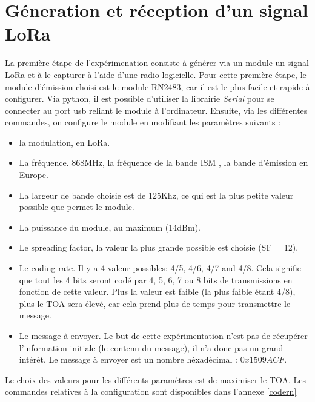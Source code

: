 \newpage

\section{Géneration et réception d'un signal LoRa} \label{signallora}

La première étape de l'expérimenation consiste à générer via un module un signal LoRa et à le capturer à l'aide d'une radio logicielle. Pour cette première étape, le module d'émission choisi est le module RN2483, car il est le plus facile et rapide à configurer.
Via python, il est possible d'utiliser la librairie \textit{Serial} pour se connecter au port usb reliant le module à l'ordinateur. Ensuite, via les différentes commandes, on configure le module en modifiant les paramètres suivants : 

\vspace{0.1cm}

\begin{itemize}
\item la modulation, en LoRa.
\item La fréquence. 868MHz, la fréquence de la bande ISM , la bande d'émission en Europe.
\item La largeur de bande choisie est de 125Khz, ce qui est la plus petite valeur possible que permet le module.
\item La puissance du module, au maximum (14dBm).
\item Le spreading factor, la valeur la plus grande possible est choisie (SF = 12).
\item Le coding rate. Il y a 4 valeur possibles: 4/5, 4/6, 4/7 and 4/8. Cela signifie que tout les 4 bits seront codé par 4, 5, 6, 7 ou 8 bits de transmissions en fonction de cette valeur. Plus la valeur est faible (la plus faible étant 4/8), plus le TOA sera élevé, car cela prend plus de temps pour transmettre le message.
\item Le message à envoyer. Le but de cette expérimentation n'est pas de récupérer l'information initiale (le contenu du message), il n'a donc pas un grand intérêt. Le message à envoyer est un nombre héxadécimal : $0x1509ACF$.
\end{itemize}

\vspace{0.1cm}

Le choix des valeurs pour les différents paramètres est de maximiser le TOA. Les commandes relatives à la configuration sont disponibles dans l'annexe \ref{codern}


